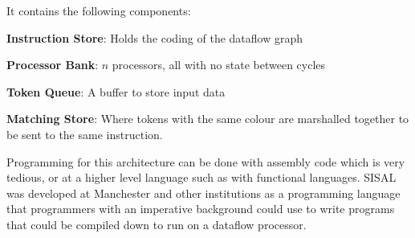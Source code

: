 
It contains the following components:

\begin{description}
\item \textbf{Instruction Store}: Holds the coding of the dataflow graph
\item \textbf{Processor Bank}: $n$ processors, all with no state between cycles
\item \textbf{Token Queue}: A buffer to store input data
\item \textbf{Matching Store}: Where tokens with the same colour are marshalled
together to be sent to the same instruction.
\end{description}

Programming for this architecture can be done with assembly code which
is very tedious, or at a higher level language such as with functional
languages. SISAL was developed at Manchester and other institutions as
a programming language that programmers with an imperative background
could use to write programs that could be compiled down to run on a
dataflow processor.

{}

